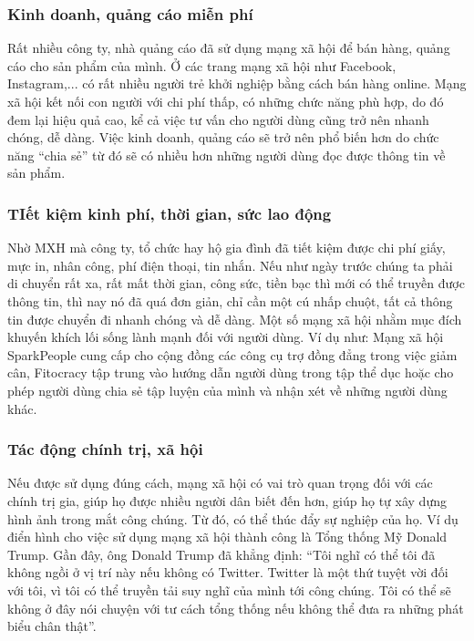 		\subsubsection{Kinh doanh, quảng cáo miễn phí}
		Rất nhiều công ty, nhà quảng cáo đã sử dụng mạng xã hội để bán hàng, quảng cáo cho sản phẩm của mình. Ở các trang mạng xã hội như Facebook, Instagram,... có rất nhiều người trẻ khởi nghiệp bằng cách bán hàng online. Mạng xã hội kết nối con người với chi phí thấp, có những chức năng phù hợp, do đó đem lại hiệu quả cao, kể cả việc tư vấn cho người dùng cũng trở nên nhanh chóng, dễ dàng. Việc kinh doanh, quảng cáo sẽ trở nên phổ biến hơn do chức năng “chia sẻ” từ đó sẽ có nhiều hơn những người dùng đọc được thông tin về sản phẩm.
		\subsubsection{TIết kiệm kinh phí, thời gian, sức lao động}
		Nhờ MXH mà công ty, tổ chức hay hộ gia đình đã tiết kiệm được chi phí giấy, mực in, nhân công, phí điện thoại, tin nhắn. Nếu như ngày trước chúng ta phải di chuyển rất xa, rất mất thời gian, công sức, tiền bạc thì mới có thể truyền được thông tin, thì nay nó đã quá đơn giản, chỉ cần một cú nhấp chuột, tất cả thông tin được chuyển đi nhanh chóng và dễ dàng. Một số mạng xã hội nhằm mục đích khuyến khích lối sống lành mạnh đối với người dùng. Ví dụ như: Mạng xã hội SparkPeople cung cấp cho cộng đồng các công cụ trợ đồng đẳng trong việc giảm cân, Fitocracy tập trung vào hướng dẫn người dùng trong tập thể dục hoặc cho phép người dùng chia sẻ tập luyện của mình và nhận xét về những người dùng khác.
		\subsubsection{Tác động chính trị, xã hội}
		Nếu được sử dụng đúng cách, mạng xã hội có vai trò quan trọng đối với các chính trị gia, giúp họ được nhiều người dân biết đến hơn, giúp họ tự xây dựng hình ảnh trong mắt công chúng. Từ đó, có thể thúc đẩy sự nghiệp của họ. Ví dụ điển hình cho việc sử dụng mạng xã hội thành công là Tổng thống Mỹ Donald Trump. Gần đây, ông Donald Trump đã khẳng định: “Tôi nghĩ có thể tôi đã không ngồi ở vị trí này nếu không có Twitter. Twitter là một thứ tuyệt vời đối với tôi, vì tôi có thể truyền tải suy nghĩ của mình tới công chúng. Tôi có thể sẽ không ở đây nói chuyện với tư cách tổng thống nếu không thể đưa ra những phát biểu chân thật”.
		
